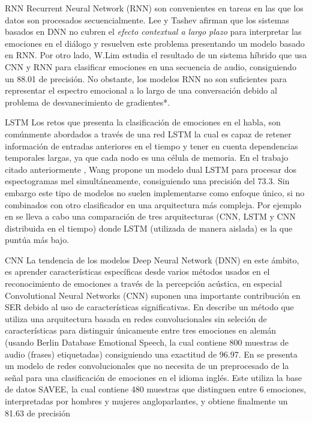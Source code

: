 \documentclass[11pt,a4paper,spanish]{book}
\begin{document}
	RNN 
	Recurrent Neural Network (RNN) son convenientes en tareas en las que los datos son procesados secuencialmente.
	Lee y Tashev \cite{Lee2015} afirman que los sistemas basados en DNN no cubren el \emph{efecto contextual a largo plazo} para interpretar las emociones en el diálogo y resuelven este problema presentando un modelo basado en RNN. Por otro lado, W.Lim \cite{Lim2017} estudia el resultado de un sistema híbrido que usa CNN y RNN para clasificar emociones en una secuencia de audio, consiguiendo un 88.01 de precisión.
	No obstante, los modelos RNN no son suficientes para representar el espectro emocional a lo largo de una conversación debido al problema de desvanecimiento de gradientes*.
	
	LSTM
	Los retos que presenta la clasificación de emociones en el habla, son comúnmente abordados a través de una red LSTM la cual es capaz de retener información de entradas anteriores en el tiempo y tener en cuenta dependencias temporales largas, ya que cada nodo es una célula de memoria.
	En el trabajo citado anteriormente \cite{Wang2020}, Wang propone un modelo dual LSTM para procesar dos espectogramas mel simultáneamente, consiguiendo una precisión del 73.3. 
	Sin embargo este tipo de modelos no suelen implementarse como enfoque único, si no combinados con otro clasificador en una arquitectura más compleja. Por ejemplo en \cite{Lim2017} se lleva a cabo una comparación de tres  arquitecturas (CNN, LSTM y CNN distribuida en el tiempo) donde LSTM (utilizada de manera aislada) es la que puntúa más bajo.	
	
	CNN
	La tendencia de los modelos Deep Neural Network (DNN) en este ámbito, es aprender características específicas desde varios métodos usados en el reconocimiento de emociones a través de la percepción acústica, en especial Convolutional Neural Networks (CNN) suponen una importante contribución en SER debido al uso de características significativas.
	En \cite{Harar2017} describe un método que utiliza una arquitectura basada en redes convolucionales sin seleción de características para distinguir únicamente entre tres emociones en alemán (usando Berlin Database Emotional Speech, la cual contiene 800 muestras de audio (frases) etiquetadas) consiguiendo una exactitud de 96.97. En \cite{AbdulQayyum2019} se presenta un modelo de redes convolucionales que no necesita de un preprocesado de la señal para una clasificación de emociones en el idioma inglés. Este utiliza la base de datos SAVEE, la cual contiene 480 muestras que distinguen entre 6 emociones, interpretadas por hombres y mujeres angloparlantes, y obtiene finalmente un 81.63 de precisión
	
	\printbibliography
	
\end{document}
